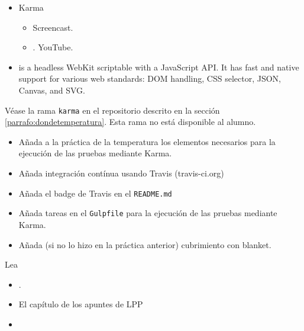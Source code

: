 \begin{itemize}
\begin{itemize}
\end{itemize}
\item Karma
\begin{itemize}
\item
{} Screencast.
\item
{}. YouTube.
\end{itemize}
\item
{}
is a headless WebKit scriptable with a JavaScript API. It has fast and native support for various web standards: DOM handling, CSS selector, JSON, Canvas, and SVG.
\end{itemize}

\label{sectionpractica:conversordetemperaturasconkarmaytravis}


Véase  la rama \verb|karma| en el repositorio descrito en la sección
\ref{parrafo:dondetemperatura}.
Esta rama no está disponible al alumno.


\begin{itemize}
\item Añada a la práctica de la temperatura los elementos necesarios para la ejecución de las pruebas mediante Karma.
\item Añada integración contínua usando Travis (travis-ci.org)
\item Añada el badge de Travis en el \verb|README.md|
\item Añada tareas en el \verb`Gulpfile` para la ejecución de las pruebas mediante Karma.
\item Añada (si no lo hizo en la práctica anterior) cubrimiento con blanket.
\end{itemize}

Lea
\begin{itemize}
\item
{}.
\item El capítulo 
de los apuntes de LPP
\item
{}
\end{itemize}

